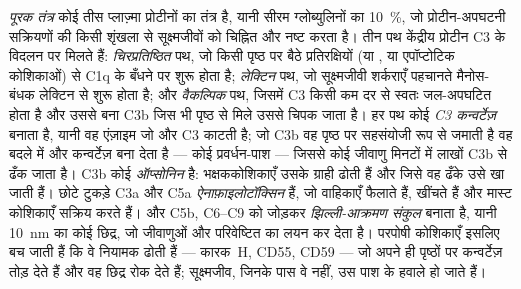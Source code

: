 \begin{definition}[पूरक तंत्र]\label{def:b3:innate-immunity:complement}
\emph{पूरक तंत्र} कोई तीस प्लाज़्मा प्रोटीनों का तंत्र है, यानी सीरम
ग्लोब्युलिनों का \qty{10}{\%}, जो प्रोटीन-अपघटनी सक्रियणों की किसी
शृंखला से सूक्ष्मजीवों को चिह्नित और नष्ट करता है। तीन पथ केंद्रीय
प्रोटीन C3 के विदलन पर मिलते हैं: \emph{चिरप्रतिष्ठित} पथ, जो किसी
पृष्ठ पर बैठे प्रतिरक्षियों (या , या एपॉप्टोटिक
कोशिकाओं) से C1q के बँधने पर शुरू होता है; \emph{लेक्टिन} पथ, जो
सूक्ष्मजीवी शर्कराएँ पहचानते मैनोस-बंधक लेक्टिन से शुरू होता है; और
\emph{वैकल्पिक} पथ, जिसमें C3 किसी कम दर से स्वतः जल-अपघटित होता है और
उससे बना C3b जिस भी पृष्ठ से मिले उससे चिपक जाता है। हर पथ कोई
\emph{C3 कन्वर्टेज़} बनाता है, यानी वह एंज़ाइम जो और C3 काटती है; जो
C3b वह पृष्ठ पर सहसंयोजी रूप से जमाती है वह बदले में और कन्वर्टेज़ बना
देता है --- कोई प्रवर्धन-पाश --- जिससे कोई जीवाणु मिनटों में लाखों C3b
से ढँक जाता है। C3b कोई \emph{ऑप्सोनिन} है: भक्षककोशिकाएँ उसके ग्राही
ढोती हैं और जिसे वह ढँके उसे खा जाती हैं। छोटे टुकड़े C3a और C5a
\emph{ऐनाफ़ाइलोटॉक्सिन} हैं, जो वाहिकाएँ फैलाते हैं, 
खींचते हैं और मास्ट कोशिकाएँ सक्रिय करते हैं। और C5b, C6--C9 को जोड़कर
\emph{झिल्ली-आक्रमण संकुल} बनाता है, यानी \qty{10}{nm} का कोई छिद्र, जो
 जीवाणुओं और परिवेष्टित  का लयन कर देता है।
परपोषी कोशिकाएँ इसलिए बच जाती हैं कि वे नियामक ढोती हैं --- कारक~H,
CD55, CD59 --- जो अपने ही पृष्ठों पर कन्वर्टेज़ तोड़ देते हैं और वह
छिद्र रोक देते हैं; सूक्ष्मजीव, जिनके पास वे नहीं, उस पाश के हवाले हो
जाते हैं।
\end{definition}


